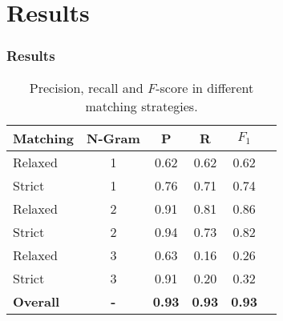 \section{Results}


\begin{frame}
	\frametitle{Results\footnotemark}
\begin{table}[htbp]
    	\footnotesize
	\caption{Precision, recall and $F$-score in different matching strategies.}
	\myfloatalign
    \begin{tabular}{lccccc}
    \toprule
	{\bf Matching} & {\bf N-Gram} &  {\bf P} & {\bf R} & {\bf $F_1$} \\
	\midrule
	Relaxed & 1 & 0.62 & 0.62 & 0.62 \\
	Strict & 1 & 0.76 & 0.71 & 0.74 \\
	Relaxed & 2 & 0.91 & 0.81 & 0.86 \\
	Strict & 2 & 0.94 & 0.73 & 0.82 \\
	Relaxed & 3 & 0.63 & 0.16 & 0.26 \\
	Strict & 3 & 0.91 & 0.20 & 0.32 \\
	\midrule
	{\bf Overall} & {\bf -} & {\bf 0.93} & {\bf 0.93} & {\bf 0.93} \\
	\bottomrule
    \end{tabular}
  \label{tab:abbreviation_metrics}
\end{table}
\end{frame}


